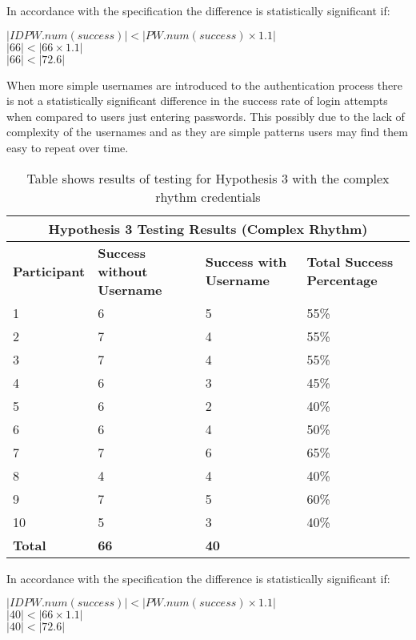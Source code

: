 \documentclass{article}
\begin{document}
In accordance with the specification the difference is statistically significant if: 
\begin{center}
    $ |IDPW.num(success)| < |PW.num(success) \times 1.1|$ \\
    $ |66| < |66 \times 1.1| $ \\
    $ |66| < |72.6| $
\end{center} 

When more simple usernames are introduced to the authentication process there is not a statistically significant difference in the success rate of login attempts when compared to users just entering passwords. This possibly due to the lack of complexity of the usernames and as they are simple patterns users may find them easy to repeat over time.  

{
\begin{table} [H]
\centering
\begin{tabular}{ |p{2cm}|p{4cm}|p{4cm}| p{4cm} | }
\hline
\multicolumn{4}{|c|}{\textbf{Hypothesis 3 Testing Results (Complex Rhythm)}} \\
\hline
\textbf{Participant} & \textbf{Success without Username} & \textbf{Success with Username} & \textbf{Total Success Percentage} \\
\hline
1 & 6 & 5 & 55\% \\
\hline
2 & 7 & 4 & 55\% \\
\hline
3 & 7 & 4 & 55\% \\
\hline
4 & 6 & 3 & 45\%  \\
\hline
5 & 6 & 2 & 40\% \\
\hline
6 & 6 & 4 & 50\% \\
\hline
7 & 7 & 6 & 65\% \\
\hline
8 & 4 & 4 & 40\% \\
\hline
9 & 7 & 5 & 60\% \\
\hline
10 & 5 & 3 & 40\% \\
\hline
\textbf{Total} & \textbf{66} & \textbf{40} & \\
\hline
\end{tabular}
\caption{Table shows results of testing for Hypothesis 3 with the complex rhythm credentials}
\label{table:4}
\end{table}
}

In accordance with the specification the difference is statistically significant if: 
\begin{center}
    $ |IDPW.num(success)| < |PW.num(success) \times 1.1|$ \\
    $ |40| < |66 \times 1.1| $ \\
    $ |40| < |72.6| $
\end{center} 
\end{document}
